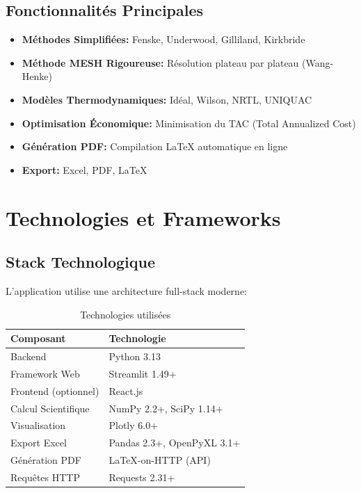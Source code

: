 \documentclass[11pt,a4paper]{article}
\begin{document}
\subsection{Fonctionnalités Principales}

\begin{itemize}
\item \textbf{Méthodes Simplifiées:} Fenske, Underwood, Gilliland, Kirkbride
\item \textbf{Méthode MESH Rigoureuse:} Résolution plateau par plateau (Wang-Henke)
\item \textbf{Modèles Thermodynamiques:} Idéal, Wilson, NRTL, UNIQUAC
\item \textbf{Optimisation Économique:} Minimisation du TAC (Total Annualized Cost)
\item \textbf{Génération PDF:} Compilation LaTeX automatique en ligne
\item \textbf{Export:} Excel, PDF, LaTeX
\end{itemize}

\section{Technologies et Frameworks}

\subsection{Stack Technologique}

L'application utilise une architecture full-stack moderne:

\begin{table}[h]
\centering
\begin{tabular}{ll}
\toprule
\textbf{Composant} & \textbf{Technologie} \\
\midrule
Backend & Python 3.13 \\
Framework Web & Streamlit 1.49+ \\
Frontend (optionnel) & React.js \\
Calcul Scientifique & NumPy 2.2+, SciPy 1.14+ \\
Visualisation & Plotly 6.0+ \\
Export Excel & Pandas 2.3+, OpenPyXL 3.1+ \\
Génération PDF & LaTeX-on-HTTP (API) \\
Requêtes HTTP & Requests 2.31+ \\
\bottomrule
\end{tabular}
\caption{Technologies utilisées}
\end{table}
\end{document}
